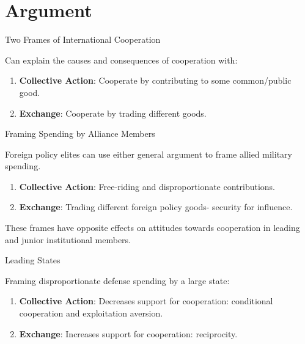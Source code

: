 \documentclass[12pt]{beamer}
\begin{document}

\section{Argument} 


\begin{frame}{Two Frames of International Cooperation}

Can explain the causes and consequences of cooperation with:

\pause 
\begin{enumerate} 
\item \textbf{Collective Action}: Cooperate by contributing to some common/public good. 
\pause 
\item \textbf{Exchange}: Cooperate by trading different goods. 
\end{enumerate}


\end{frame} 


\begin{frame}{Framing Spending by Alliance Members}

Foreign policy elites can use either general argument to frame allied military spending. 

\pause 
\begin{enumerate} 
\item \textbf{Collective Action}: Free-riding and disproportionate contributions. 
\pause 
\item \textbf{Exchange}: Trading different foreign policy goods- security for influence. 
\end{enumerate}


\end{frame} 


\begin{frame}[standout]

These frames have opposite effects on attitudes towards cooperation in leading and junior institutional members. 

\end{frame} 


\begin{frame}{Leading States}

Framing disproportionate defense spending by a large state: 
\pause 
\begin{enumerate} 
\item \textbf{Collective Action}: Decreases support for cooperation: conditional cooperation and exploitation aversion. 
\pause 
\item \textbf{Exchange}: Increases support for cooperation: reciprocity. 
\end{enumerate}


\end{frame} 
\end{document}
